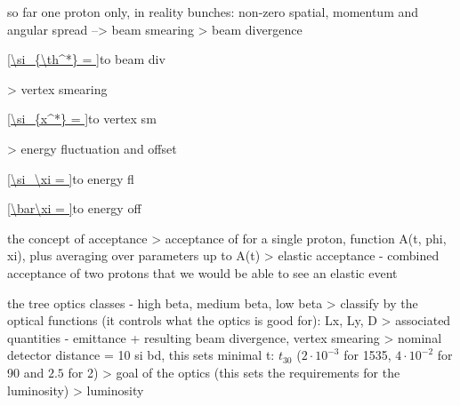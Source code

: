 \> so far one proton only, in reality bunches: non-zero spatial, momentum and angular spread --> beam smearing
\>> beam divergence

\eqref{\si_{\th^*} = }{to beam div}

\>> vertex smearing

\eqref{\si_{x^*} = }{to vertex sm}

\>> energy fluctuation and offset

\eqref{\si_\xi = }{to energy fl}

\eqref{\bar\xi = }{to energy off}

\> the concept of acceptance
\>> acceptance of for a single proton, function A(t, phi, xi), plus averaging over parameters up to A(t)
\>> elastic acceptance - combined acceptance of two protons that we would be able to see an elastic event

\> the tree optics classes - high beta, medium beta, low beta
\>> classify by the optical functions (it controls what the optics is good for): Lx, Ly, D
\>> associated quantities - emittance + resulting beam divergence, vertex smearing
\>> nominal detector distance = 10 si bd, this sets minimal t: $t_{30}$ ($2\cdot10^{-3}$ for 1535, $4\cdot10^{-2}$ for 90 and $2.5$ for 2)
\>> goal of the optics (this sets the requirements for the luminosity)
\>> luminosity

\iffalse
\itskip0pt
\indent 1) {\fgt\bf high $\be^*$\fg}
\> $\be^* = 1535\un{m}$
\> ${\cal L} \approx 10^{28} \div 10^{29}\un{cm^{-2}s^{-1}}$
\> elastic resolution: $\si(\th_x) \approx 0.23\un{\mu rad}$, $\si(\th_y) \approx 0.22\un{\mu rad}$
\> vertical sensors at $1.35\un{mm}$ from beam center

\vfil
2) {\fgt\bf medium $\be^*$\fg}
\> $\be^* = 90\un{m}$
\> ${\cal L} \approx 10^{30}\un{cm^{-2}s^{-1}}$
\> elastic resolution: $\si(\th_x) \approx 5\un{\mu rad}$ (low effective length), $\si(\th_y) \approx 1.7\un{\mu rad}$
\> vertical sensors at $6.4\un{mm}$ from beam center

\vfil
3) {\fgt\bf low $\be^*$\fg}

\> $\be^* = 0.5\div 2\un{m}$ (early running: $p = 5\un{TeV}$, $\be^* \sim 3\un{m}$)
\> ${\cal L} \approx 10^{33}\un{cm^{-2}s^{-1}}$
\> elastic resolution: $\si(\th_x) \approx 16\un{\mu rad}$, $\si(\th_y) \approx 12\un{\mu rad}$
\> vertical sensors at $3.3\un{mm}$ from beam center

\vfil
\> sensors at $10\si + 0.5\un{mm}$ from beam center
\> resolution (usually) limited by beam divergence
\fi

